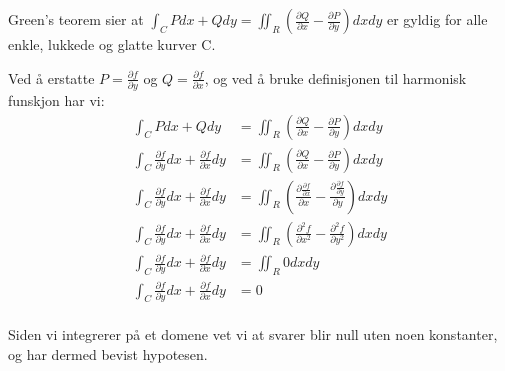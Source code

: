 \documentclass{../../myassignment}
\begin{document}
	\pagebreak
	\begin{answer}
		Green's teorem sier at $\int_C P dx + Q dy = \iint_R (\frac{\partial Q}{\partial x} - \frac{\partial P}{\partial y}) dxdy$ er gyldig for alle enkle, lukkede og glatte kurver C. 

		Ved å erstatte $P=\frac{\partial f}{\partial y}$ og $Q=\frac{\partial f}{\partial x}$, og ved å bruke definisjonen til harmonisk funskjon har vi:
		\begin{align*}
			\int_C P dx + Q dy &= \iint_R (\frac{\partial Q}{\partial x} - \frac{\partial P}{\partial y}) dxdy \\[1cm]
			\int_C \frac{\partial f}{\partial y} dx + \frac{\partial f}{\partial x} dy &= \iint_R (\frac{\partial Q}{\partial x} - \frac{\partial P}{\partial y}) dxdy \\[1cm]
			\int_C \frac{\partial f}{\partial y} dx + \frac{\partial f}{\partial x} dy &= \iint_R (\frac{\partial \frac{\partial f}{\partial x}}{\partial x} - \frac{\partial \frac{\partial f}{\partial y}}{\partial y}) dxdy \\[1cm]
			\int_C \frac{\partial f}{\partial y} dx + \frac{\partial f}{\partial x} dy &= \iint_R (\frac{\partial^2 f}{\partial x^2} - \frac{\partial^2 f}{\partial y^2}) dxdy \\[1cm]
			\int_C \frac{\partial f}{\partial y} dx + \frac{\partial f}{\partial x} dy &= \iint_R 0 dxdy \\
			\int_C \frac{\partial f}{\partial y} dx + \frac{\partial f}{\partial x} dy &= 0 \\
		\end{align*}

		Siden vi integrerer på et domene vet vi at svarer blir null uten noen konstanter, og har dermed bevist hypotesen.

	\end{answer}
\end{document}
